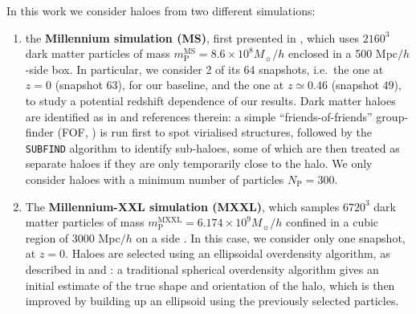 \documentclass[a4paper,fleqn,usenatbib]{mnras}
\begin{document}
In this work we consider haloes from two different simulations: 
\begin{enumerate}
\item the \textbf{Millennium simulation (MS)}, first presented in \citet{Springeletal2005}, which uses $2160^3$ dark matter particles of mass $m_{\mathrm{P}}^{\mathrm{MS}} =8.6 \times 10^8 M_{\sun}/h$ enclosed in a 500 Mpc$/h$-side box.
In particular, we consider 2 of its 64 snapshots, i.e.\ the one at $z = 0$ (snapshot $63$), for our baseline, and the one at $z \simeq 0.46$ (snapshot $49$), to study a potential redshift dependence of our results. Dark matter haloes are identified as in \citet{Joachimietal2013a} and references therein: a simple ``friends-of-friends'' group-finder (FOF, \citealt{Davisetal1985}) is run first to spot virialised structures, followed by the \texttt{SUBFIND} algorithm \citep{Springeletal2001, Springeletal2005} to identify sub-haloes, some of which are then treated as separate haloes if they are only temporarily close to the halo. We only consider haloes with a minimum number of particles $N_{\mathrm{P}} = 300$.
\item The \textbf{Millennium-XXL simulation (MXXL)}, which samples $6720^3$ dark matter particles of mass $m_{\mathrm{P}}^{\mathrm{MXXL}} = 6.174 \times 10^9 M_{\sun}/h$ confined in a cubic region of $3000$ Mpc$/h$ on a side \citep{Anguloetal2012}. In this case, we consider only one snapshot, at $z = 0$. Haloes are selected using an ellipsoidal overdensity algorithm, as described in \citet{Despalietal2013} and \citet{Bonamigoetal2015}: a traditional spherical overdensity algorithm \citep{LaceyCole1994} gives an initial estimate of the true shape and orientation of the halo, which is then improved by building up an ellipsoid using the previously selected particles. %
\end{enumerate} 
\end{document}
